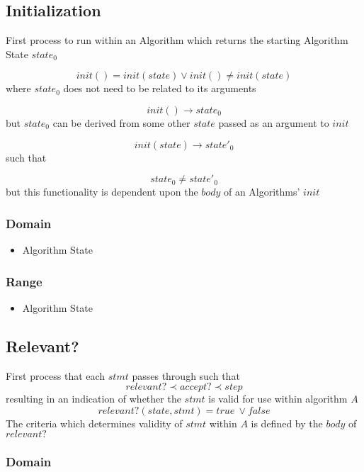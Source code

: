 \documentclass[../main.tex]{subfiles}
\begin{document}
\subsection{Initialization}

First process to run within an Algorithm which returns the starting Algorithm State $state_{0}$

$$ init() = init(state) \lor init() \not= init(state)$$
where $state_{0}$ does not need to be related to its arguments

$$init() \to state_{0}$$
but $state_{0}$ can be derived from some other $state$ passed as an argument to $init$

$$init(state) \to state'_{0}$$
such that

$$state_{0} \not= state'_{0} $$
but this functionality is dependent upon the $body$ of an Algorithms' $init$

\subsubsection{Domain}

\begin{itemize}
\item Algorithm State
\end{itemize}

\subsubsection{Range}

\begin{itemize}
\item Algorithm State
\end{itemize}

\subsection{Relevant?}

First process that each $stmt$ passes through such that
$$relevant? \prec accept? \prec step$$
resulting in an indication of whether the $stmt$ is valid for use within algorithm $A$
$$relevant?(state, stmt) = true \ \lor false$$
The criteria which determines validity of $stmt$ within $A$ is defined by the $body$ of $relevant?$

\subsubsection{Domain}
\end{document}
